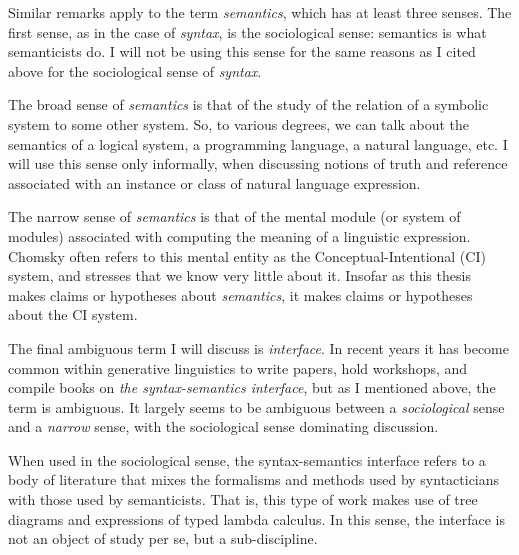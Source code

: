 \documentclass[MilwayThesis]{subfiles}
\begin{document}
Similar remarks apply to the term \textit{semantics}, which has at least three senses.
The first sense, as in the case of \textit{syntax}, is the sociological sense: semantics is what semanticists do.
I will not be using this sense for the same reasons as I cited above for the sociological sense of \textit{syntax}.

The broad sense of \textit{semantics} is that of the study of the relation of a symbolic system to some other system.
So, to various degrees, we can talk about the semantics of a logical system, a programming language, a natural language, etc.
I will use this sense only informally, when discussing notions of truth and reference associated with an instance or class of natural language expression.

The narrow sense of \textit{semantics} is that of the mental module (or system of modules) associated with computing the meaning of a linguistic expression.
Chomsky often refers to this mental entity as the Conceptual-Intentional (CI) system, and stresses that we know very little about it.
Insofar as this thesis makes claims or hypotheses about \textit{semantics}, it makes claims or hypotheses about the CI system.

The final ambiguous term I will discuss is \textit{interface}.
In recent years it has become common within generative linguistics to write papers, hold workshops, and compile books on \textit{the syntax-semantics interface}, but as I mentioned above, the term is ambiguous.
It largely seems to be ambiguous between a \textit{sociological} sense and a \textit{narrow} sense, with the sociological sense dominating discussion.

When used in the sociological sense, the syntax-semantics interface refers to a body of literature that mixes the formalisms and methods used by syntacticians with those used by semanticists.
That is, this type of work makes use of tree diagrams and expressions of typed lambda calculus.
In this sense, the interface is not an object of study per se, but a sub-discipline.
\end{document}
